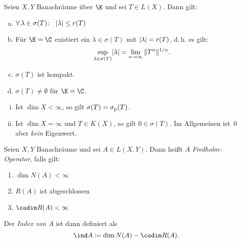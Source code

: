\begin{thSatz}
    Seien $X,Y$ Banachräume über $\K$ und sei $T\in L(X)$. Dann gilt:
    \begin{enumerate}[(a)]
        \item
            $\forall\,\lambda\in\sigma(T)\colon\;\;
            \lvert\lambda\rvert \leq r(T)$
        
        \item
            Für $\K=\C$ existiert ein $\lambda\in\sigma(T)$ mit
            $\lvert\lambda\rvert = r(T)$, d.\,h. es gilt: 
            \[ \sup_{\lambda\in\sigma(T)}\lvert\lambda\rvert
            = \lim_{n\to\infty}\,\lVert T^n\rVert^{1/n} . \]
        
        \item
            $\sigma(T)$ ist kompakt.
            
        \item
            $\sigma(T) \neq \emptyset$ für $\K=\C$.
    \end{enumerate}
\end{thSatz}


\pagebreak[2]
\begin{thBemerkungen}\hfill
    \begin{enumerate}[(i)]
        \item
            Ist $\dim X < \infty$, so gilt $\sigma(T) = \sigma_{\mathrm p}(T)$.
            
        \item
            Ist $\dim X = \infty$ und $T\in K(X)$, so gilt $0\in\sigma(T)$.
            Im Allgemeinen ist~$0$ aber \emph{kein} Eigenwert.
    \end{enumerate}
\end{thBemerkungen}


\begin{thDef}
    Seien $X,Y$ Banachräume und sei $A\in L(X,Y)$. Dann heißt $A$
    \emph{Fredholm-Operator}, falls gilt:
    \begin{enumerate}[(1)]
        \item
            $\dim N(A) < \infty$
        \item
            $R(A)$ ist abgeschlossen
        \item
            $\codim R(A) < \infty$
    \end{enumerate}
    Der \emph{Index von $A$} ist dann definiert als
    \[ \ind A \defeq \dim N(A) - \codim R(A)  . \]
\end{thDef}

